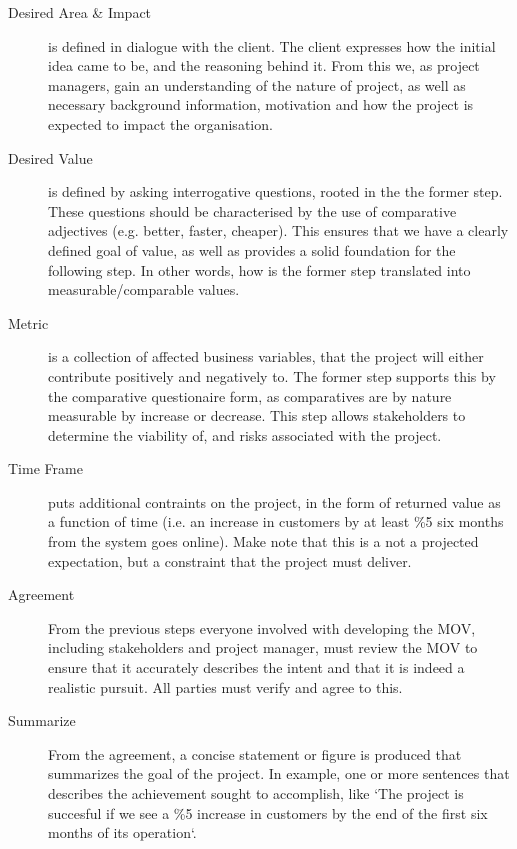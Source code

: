 \documentclass[11pt]{article}
\begin{document}
\begin{description}
    \item[Desired Area \& Impact] is defined in dialogue with the client. The
        client expresses how the initial idea came to be, and the reasoning
        behind it. From this we, as project managers, gain an understanding of
        the nature of project, as well as necessary background information,
        motivation and how the project is expected to impact the organisation.
    \item[Desired Value] is defined by asking interrogative questions, rooted
        in the the former step. These questions should be characterised by the
        use of comparative adjectives (e.g. better, faster, cheaper). This
        ensures that we have a clearly defined goal of value, as well as
        provides a solid foundation for the following step. In other words,
        how is the former step translated into measurable/comparable values.
    \item[Metric] is a collection of affected business variables, that the
        project will either contribute positively and negatively to. The
        former step supports this by the comparative questionaire form, as
        comparatives are by nature measurable by increase or decrease. This
        step allows stakeholders to determine the viability of, and risks
        associated with the project.
    \item[Time Frame] puts additional contraints on the project, in the form
        of returned value as a function of time (i.e. an increase in customers
        by at least \%5 six months from the system goes online). Make note that
        this is a not a projected expectation, but a constraint that the
        project must deliver.
    \item[Agreement] From the previous steps everyone involved with developing
        the MOV, including stakeholders and project manager, must review the
        MOV to ensure that it accurately describes the intent and that it is
        indeed a realistic pursuit. All parties must verify and agree to this.
    \item[Summarize] From the agreement, a concise statement or figure is
        produced that summarizes the goal of the project. In example, one or
        more sentences that describes the achievement sought to accomplish,
        like `The project is succesful if we see a \%5 increase in customers
        by the end of the first six months of its operation`.
\end{description}
\end{document}
